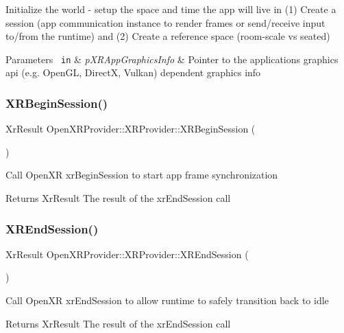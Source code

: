 Initialize the world -\/ setup the space and time the app will live in (1) Create a session (app communication instance to render frames or send/receive input to/from the runtime) and (2) Create a reference space (room-\/scale vs seated) 
\begin{DoxyParams}[1]{Parameters}
\mbox{\texttt{ in}}  & {\em p\+X\+R\+App\+Graphics\+Info} & Pointer to the application\textquotesingle{}s graphics api (e.\+g. Open\+GL, DirectX, Vulkan) dependent graphics info \\
\hline
\end{DoxyParams}
\mbox{\label{class_open_x_r_provider_1_1_x_r_provider_a5599fa1da5f74f40e02fdf2a8d3f7a55}} 
\subsubsection{\texorpdfstring{XRBeginSession()}{XRBeginSession()}}
{\footnotesize\ttfamily Xr\+Result Open\+X\+R\+Provider\+::\+X\+R\+Provider\+::\+X\+R\+Begin\+Session (\begin{DoxyParamCaption}{ }\end{DoxyParamCaption})}

Call Open\+XR xr\+Begin\+Session to start app frame synchronization \begin{DoxyReturn}{Returns}
Xr\+Result The result of the xr\+End\+Session call 
\end{DoxyReturn}
\mbox{\label{class_open_x_r_provider_1_1_x_r_provider_a972be4b6da3dbc7c2db5e5d98c815401}} 
\subsubsection{\texorpdfstring{XREndSession()}{XREndSession()}}
{\footnotesize\ttfamily Xr\+Result Open\+X\+R\+Provider\+::\+X\+R\+Provider\+::\+X\+R\+End\+Session (\begin{DoxyParamCaption}{ }\end{DoxyParamCaption})}

Call Open\+XR xr\+End\+Session to allow runtime to safely transition back to idle \begin{DoxyReturn}{Returns}
Xr\+Result The result of the xr\+End\+Session call 
\end{DoxyReturn}


